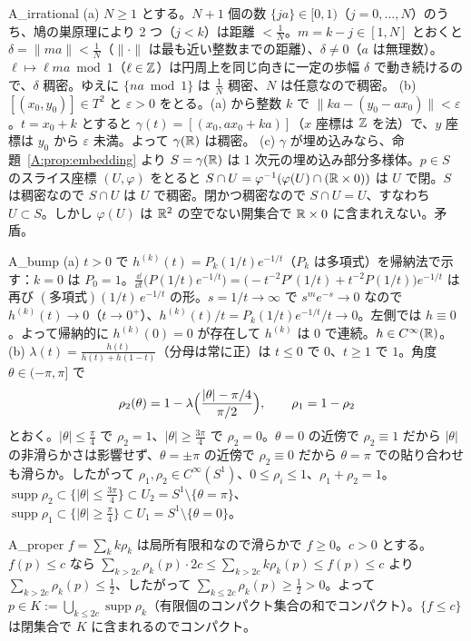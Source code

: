 \begin{soll}{A_irrational}
(a) $N\ge1$ とする。$N+1$ 個の数 $\{ja\}\in[0,1)$（$j=0,\dots,N$）のうち、鳩の巣原理により 2 つ（$j<k$）は距離 $<\frac1N$。$m=k-j\in[1,N]$ とおくと $\delta=\|ma\|<\frac1N$（$\|\cdot\|$ は最も近い整数までの距離）、$\delta\ne0$（$a$ は無理数）。$\ell\mapsto\ell ma\bmod1$（$\ell\in\mathbb Z$）は円周上を同じ向きに一定の歩幅 $\delta$ で動き続けるので、$\delta$ 稠密。ゆえに $\{na\bmod1\}$ は $\frac1N$ 稠密、$N$ は任意なので稠密。
(b) $[(x_0,y_0)]\in T^2$ と $\varepsilon>0$ をとる。(a) から整数 $k$ で $\|ka-(y_0-ax_0)\|<\varepsilon$。$t=x_0+k$ とすると $\gamma(t)=[(x_0,ax_0+ka)]$（$x$ 座標は $\mathbb Z$ を法）で、$y$ 座標は $y_0$ から $\varepsilon$ 未満。よって $\gamma(\mathbb R)$ は稠密。
(c) $\gamma$ が埋め込みなら、命題~\ref{A:prop:embedding} より $S=\gamma(\mathbb R)$ は 1 次元の埋め込み部分多様体。$p\in S$ のスライス座標 $(U,\varphi)$ をとると $S\cap U=\varphi^{-1}(\varphi(U)\cap(\mathbb R\times0))$ は $U$ で閉。$S$ は稠密なので $S\cap U$ は $U$ で稠密。閉かつ稠密なので $S\cap U=U$、すなわち $U\subset S$。しかし $\varphi(U)$ は $\mathbb R^2$ の空でない開集合で $\mathbb R\times0$ に含まれえない。矛盾。
\end{soll}

\begin{soll}{A_bump}
(a) $t>0$ で $h^{(k)}(t)=P_k(1/t)e^{-1/t}$（$P_k$ は多項式）を帰納法で示す：$k=0$ は $P_0=1$。$\frac{\dd}{\dd t}\bigl(P(1/t)e^{-1/t}\bigr)=\bigl(-t^{-2}P'(1/t)+t^{-2}P(1/t)\bigr)e^{-1/t}$ は再び $(\text{多項式})(1/t)\,e^{-1/t}$ の形。$s=1/t\to\infty$ で $s^me^{-s}\to0$ なので $h^{(k)}(t)\to0$（$t\to0^+$）、$h^{(k)}(t)/t=P_k(1/t)e^{-1/t}/t\to0$。左側では $h\equiv0$。よって帰納的に $h^{(k)}(0)=0$ が存在して $h^{(k)}$ は $0$ で連続。$h\in C^\infty(\mathbb R)$。
(b) $\lambda(t)=\frac{h(t)}{h(t)+h(1-t)}$（分母は常に正）は $t\le0$ で $0$、$t\ge1$ で $1$。角度 $\theta\in(-\pi,\pi]$ で
\[
\rho_2(\theta)=1-\lambda\Bigl(\frac{|\theta|-\pi/4}{\pi/2}\Bigr),\qquad\rho_1=1-\rho_2
\]
とおく。$|\theta|\le\frac\pi4$ で $\rho_2=1$、$|\theta|\ge\frac{3\pi}4$ で $\rho_2=0$。$\theta=0$ の近傍で $\rho_2\equiv1$ だから $|\theta|$ の非滑らかさは影響せず、$\theta=\pm\pi$ の近傍で $\rho_2\equiv0$ だから $\theta=\pi$ での貼り合わせも滑らか。したがって $\rho_1,\rho_2\in C^\infty(S^1)$、$0\le\rho_i\le1$、$\rho_1+\rho_2=1$。$\operatorname{supp}\rho_2\subset\{|\theta|\le\frac{3\pi}4\}\subset U_2=S^1\setminus\{\theta=\pi\}$、$\operatorname{supp}\rho_1\subset\{|\theta|\ge\frac\pi4\}\subset U_1=S^1\setminus\{\theta=0\}$。
\end{soll}

\begin{soll}{A_proper}
$f=\sum_kk\rho_k$ は局所有限和なので滑らかで $f\ge0$。$c>0$ とする。$f(p)\le c$ なら $\sum_{k>2c}\rho_k(p)\cdot2c\le\sum_{k>2c}k\rho_k(p)\le f(p)\le c$ より $\sum_{k>2c}\rho_k(p)\le\frac12$、したがって $\sum_{k\le2c}\rho_k(p)\ge\frac12>0$。よって $p\in K:=\bigcup_{k\le2c}\operatorname{supp}\rho_k$（有限個のコンパクト集合の和でコンパクト）。$\{f\le c\}$ は閉集合で $K$ に含まれるのでコンパクト。
\end{soll}

